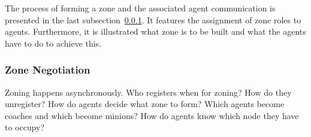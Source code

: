 The process of forming a zone and the associated agent communication is presented in the last subsection~\ref{alg:zon_formation}. It features the assignment of zone roles to agents. Furthermore, it is illustrated what zone is to be built and what the agents have to do to achieve this.



\subsubsection{Zone Negotiation}\label{alg:zon_formation}
Zoning happens asynchronously. Who registers when for zoning? How do they unregister?
How do agents decide what zone to form? Which agents become coaches and which become minions? How do agents know which node they have to occupy?


